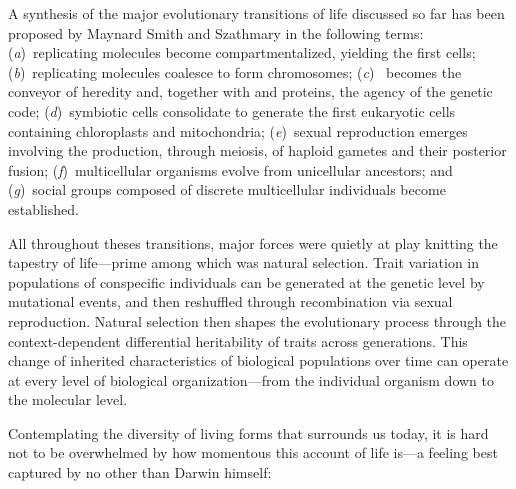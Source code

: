 \documentclass{tufte-book}
\begin{document}


A synthesis of the major evolutionary transitions of life discussed so far has
been proposed by Maynard Smith and Szathmary in the following
terms:\cite{maynard_smith_major_1997} (\emph{a})~replicating molecules become
compartmentalized, yielding the first cells; (\emph{b})~replicating molecules
coalesce to form chromosomes; (\emph{c})~ becomes the conveyor of
heredity and, together with  and proteins, the agency of the
genetic code; (\emph{d})~symbiotic cells consolidate to generate the first
eukaryotic cells containing chloroplasts and mitochondria; (\emph{e})~sexual
reproduction emerges involving the production, through meiosis, of haploid
gametes and their posterior fusion; (\emph{f})~multicellular organisms evolve
from unicellular ancestors; and (\emph{g})~social groups composed of discrete
multicellular individuals become established.

All throughout theses transitions, major forces were quietly at play knitting
the tapestry of life---prime among which was natural selection.  Trait variation
in populations of conspecific individuals can be generated at the genetic level
by mutational events, and then reshuffled through recombination via sexual
reproduction.  Natural selection then shapes the evolutionary process through
the \mbox{context-dependent} differential heritability of traits across
generations.  This change of inherited characteristics of biological populations
over time can operate at every level of biological organization---from the
individual organism down to the molecular level.

\bigskip

Contemplating the diversity of living forms that surrounds us today, it is hard
not to be overwhelmed by how momentous this account of life is---a feeling best
captured by no other than Darwin himself:\cite{darwin_origin_1864}



\end{document}
